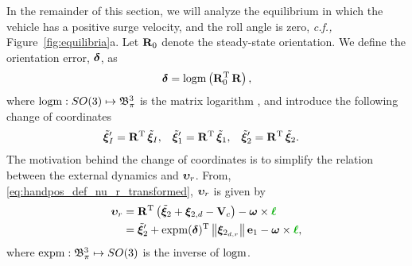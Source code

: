 In the remainder of this section, we will analyze the equilibrium in which the vehicle has a positive surge velocity, and the roll angle is zero, \emph{c.f.,} Figure~\ref{fig:equilibria}a.
Let $\mat{R}_0$ denote the steady-state orientation.
We define the orientation error, $\bs{\delta}$, as
\begin{equation}
    \bs{\delta} = {\rm logm}\left(\mat{R}_0\T\,\mat{R}\right),
    \label{eq:handpos_trajectory_delta}
\end{equation}
where ${\rm logm}: SO(3) \mapsto \ball[3]{\pi}$ is the matrix logarithm \cite{iserles_lie_2000}, and introduce the following change of coordinates
\begin{align}
    \tilde{\bs{\xi}}_I^{\prime} &= \mathbf{R}\T\,\tilde{\bs{\xi}}_I, &
    \tilde{\bs{\xi}}_1^{\prime} &= \mathbf{R}\T\,\tilde{\bs{\xi}}_1, &
    \tilde{\bs{\xi}}_2^{\prime} &= \mathbf{R}\T\,\tilde{\bs{\xi}}_2.
\end{align}
The motivation behind the change of coordinates is to simplify the relation between the external dynamics and $\bvel_r$.
From, \eqref{eq:handpos_def_nu_r_transformed}, $\bvel_r$ is given by
\begin{equation}
    \begin{split}
    \bvel_r &= \mathbf{R}\T\left(\tilde{\bs{\xi}}_2 + \bs{\xi}_{2, d} - \ocean\right) - \bs{\omega} \times \dm{\handl} \\
        &= \tilde{\bs{\xi}}_2^{\prime} + {\rm expm}(\bs{\delta})\T \norm{\bs{\xi}_{2_{d,r}}}\mat{e}_1 - \bs{\omega} \times \dm{\handl},
    \end{split}
\end{equation}
where ${\rm expm}: \ball[3]{\pi} \mapsto SO(3)$ is the inverse of ${\rm logm}$.

